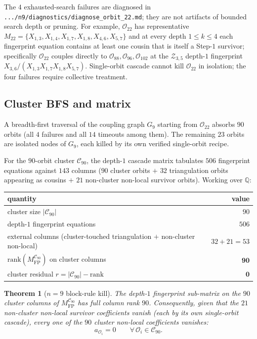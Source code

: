 \documentclass[11pt]{article}
\newtheorem{thm}{Theorem}
\theoremstyle{definition}
\begin{document}
The $4$ exhausted-search failures are diagnosed in
\verb|.../n9/diagnostics/diagnose_orbit_22.md|; they are not
artifacts of bounded search depth or pruning. For example,
$\mathcal O_{22}$ has representative
$M_{22}=\{X_{1,3},X_{1,4},X_{1,7},X_{1,8},X_{4,6},X_{5,7}\}$ and at
every depth $1\le k\le 4$ each fingerprint equation contains at
least one cousin that is itself a Step-$1$ survivor; specifically
$\mathcal O_{22}$ couples directly to
$\mathcal O_{88},\mathcal O_{96},\mathcal O_{102}$ at the
$\mathcal Z_{3,5}$ depth-$1$ fingerprint
$X_{3,6}/(X_{1,3}X_{1,7}X_{1,8}X_{5,7})$. Single-orbit cascade
cannot kill $\mathcal O_{22}$ in isolation; the four failures
require collective treatment.

\subsection{Cluster BFS and matrix}\label{subsec:cluster}

A breadth-first traversal of the coupling graph $G_9$ starting from
$\mathcal O_{22}$ absorbs $90$ orbits (all $4$ failures and all $14$
timeouts among them). The remaining $23$ orbits are isolated nodes
of $G_9$, each killed by its own verified single-orbit recipe.

For the $90$-orbit cluster $\mathcal C_{90}$, the depth-$1$ cascade
matrix tabulates $506$ fingerprint equations against $143$ columns
($90$ cluster orbits $+$ $32$ triangulation orbits appearing as
cousins $+$ $21$ non-cluster non-local survivor orbits). Working
over $\mathbb Q$:

\begin{center}\small
\begin{tabular}{lr}
\toprule
quantity & value\\
\midrule
cluster size $|\mathcal C_{90}|$ & $90$\\
depth-$1$ fingerprint equations & $506$\\
external columns (cluster-touched triangulation $+$ non-cluster non-local) & $32+21=53$\\
$\mathrm{rank}(M_{\mathrm{FP}}^{\mathcal C_{90}})$ on cluster columns & $\boldsymbol{90}$\\
cluster residual $r=|\mathcal C_{90}|-\mathrm{rank}$ & $\boldsymbol{0}$\\
\bottomrule
\end{tabular}
\end{center}

\begin{thm}[$n=9$ block-rule kill]\label{thm:n9-blockkill}
The depth-$1$ fingerprint sub-matrix on the $90$ cluster columns of
$M_{\mathrm{FP}}^{\mathcal C_{90}}$ has full column rank $90$.
Consequently, given that the $21$ non-cluster non-local survivor
coefficients vanish (each by its own single-orbit cascade), every
one of the $90$ cluster non-local coefficients vanishes:
\[
   a_{\mathcal O_i}=0 \qquad\forall\,\mathcal O_i\in\mathcal C_{90}.
\]
\end{thm}
\end{document}
